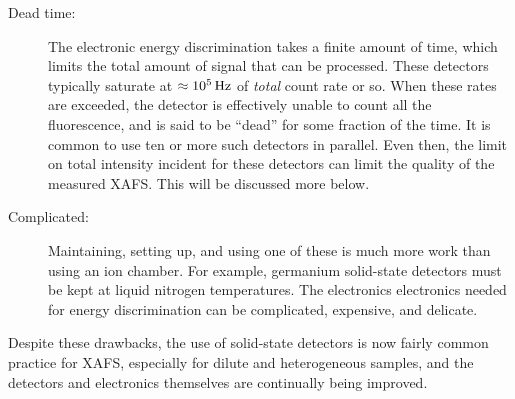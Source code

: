 \begin{description}
\item[Dead time:] The electronic energy discrimination takes a finite
  amount of time, which limits the total amount of signal that can be
  processed.  These detectors typically saturate at $\approx 10^{5}\, \rm{
    Hz}$ of {\emph{total}} count rate or so.  When these rates are
  exceeded, the detector is effectively unable to count all the
  fluorescence, and is said to be ``dead'' for some fraction of the time.
  It is common to use ten or more such detectors in parallel.  Even then,
  the limit on total intensity incident for these detectors can limit the
  quality of the measured XAFS.  This will be discussed more below.

\item[Complicated:] Maintaining, setting up, and using one of these is much
  more work than using an ion chamber.  For example, germanium solid-state
  detectors must be kept at liquid nitrogen temperatures.  The electronics
  electronics needed for energy discrimination can be complicated,
  expensive, and delicate.
\end{description}
\noindent
Despite these drawbacks, the use of solid-state detectors is now fairly
common practice for XAFS, especially for dilute and heterogeneous samples,
and the detectors and electronics themselves are continually being
improved.

